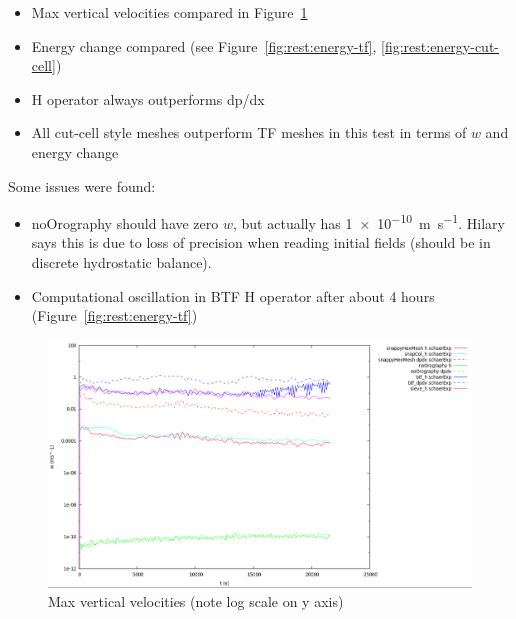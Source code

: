 \begin{itemize}
\item Max vertical velocities compared in Figure~\ref{fig:rest:w}
\item Energy change compared (see Figure~\ref{fig:rest:energy-tf}, \ref{fig:rest:energy-cut-cell})
\item H operator always outperforms dp/dx
\item All cut-cell style meshes outperform TF meshes in this test in terms of $w$ and energy change
\end{itemize}
Some issues were found:
\begin{itemize}
\item noOrography should have zero $w$, but actually has \SI{1e-10}{\meter\per\second}.  Hilary says this is due to loss of precision when reading initial fields (should be in discrete hydrostatic balance).
\item Computational oscillation in BTF H operator after about 4 hours (Figure~\ref{fig:rest:energy-tf})
\end{itemize}

\begin{figure}
\includegraphics[width=\textwidth]{interim-results/verticalVelocityPlotSnappyHexMesh.png}
\caption{Max vertical velocities (note log scale on y axis)}
\label{fig:rest:w}
\end{figure}

